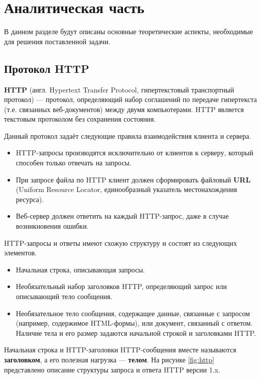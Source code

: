 \chapter{Аналитическая часть}

В данном разделе будут описаны основные теоретические аспекты, необходимые для решения поставленной задачи.

\section{Протокол HTTP}

\textbf{HTTP} (англ. Hypertext Transfer Protocol, гипертекстовый транспортный протокол) \cite{http} --- протокол, определяющий набор соглашений по передаче гипертекста (т.е. связанных веб-документов) между двумя компьютерами. HTTP является текстовым протоколом без сохранения состояния.

Данный протокол задаёт следующие правила взаимодействия клиента и сервера. \cite{web_server}

\begin{itemize}[label*=---]
	\item HTTP-запросы производятся исключительно от клиентов к серверу, который способен только отвечать на запросы.
	\item При запросе файла по HTTP клиент должен сформировать файловый \textbf{URL} (Uniform Resource Locator, единообразный указатель местонахождения ресурса). \cite{url}
	\item Веб-сервер должен ответить на каждый HTTP-запрос, даже в случае возникновения ошибки.
\end{itemize}

HTTP-запросы и ответы имеют схожую структуру и состоят из следующих элементов. \cite{http_messages}

\begin{itemize}[label*=---]
	\item Начальная строка, описывающая запросы.
	\item Необязательный набор заголовков HTTP, определяющий запрос или описывающий тело сообщения.
	\item Необязательное тело сообщения, содержащее данные, связанные с запросом (например, содержимое HTML-формы), или документ, связанный с ответом. Наличие тела и его размер задаются начальной строкой и заголовками HTTP.
\end{itemize}

Начальная строка и HTTP-заголовки HTTP-сообщения вместе называются \textbf{заголовком}, а его полезная нагрузка --- \textbf{телом}. На рисунке \ref{fig:http} представлено описание структуры запроса и ответа HTTP версии 1.x. \cite{http_messages}

